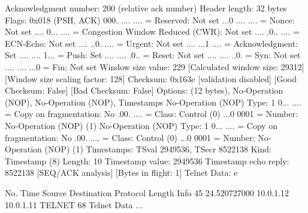     Acknowledgment number: 200    (relative ack number)
    Header length: 32 bytes
    Flags: 0x018 (PSH, ACK)
        000. .... .... = Reserved: Not set
        ...0 .... .... = Nonce: Not set
        .... 0... .... = Congestion Window Reduced (CWR): Not set
        .... .0.. .... = ECN-Echo: Not set
        .... ..0. .... = Urgent: Not set
        .... ...1 .... = Acknowledgment: Set
        .... .... 1... = Push: Set
        .... .... .0.. = Reset: Not set
        .... .... ..0. = Syn: Not set
        .... .... ...0 = Fin: Not set
    Window size value: 229
    [Calculated window size: 29312]
    [Window size scaling factor: 128]
    Checksum: 0x163e [validation disabled]
        [Good Checksum: False]
        [Bad Checksum: False]
    Options: (12 bytes), No-Operation (NOP), No-Operation (NOP), Timestamps
        No-Operation (NOP)
            Type: 1
                0... .... = Copy on fragmentation: No
                .00. .... = Class: Control (0)
                ...0 0001 = Number: No-Operation (NOP) (1)
        No-Operation (NOP)
            Type: 1
                0... .... = Copy on fragmentation: No
                .00. .... = Class: Control (0)
                ...0 0001 = Number: No-Operation (NOP) (1)
        Timestamps: TSval 2949536, TSecr 8522138
            Kind: Timestamp (8)
            Length: 10
            Timestamp value: 2949536
            Timestamp echo reply: 8522138
    [SEQ/ACK analysis]
        [Bytes in flight: 1]
Telnet
    Data: e

No.     Time           Source                Destination           Protocol Length Info
     45 24.520727000   10.0.1.12             10.0.1.11             TELNET   68     Telnet Data ...

